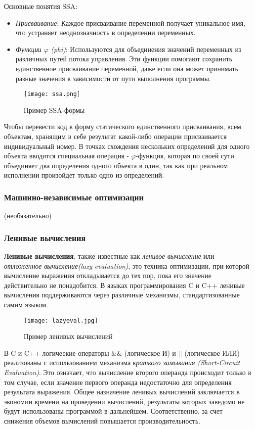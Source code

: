 Основные понятия SSA:
\begin{itemize}
    \item \textit{Присваивание}: Каждое присваивание переменной получает уникальное имя, что устраняет неоднозначность в определении переменных.
    \item \textit{Функции $\varphi$ (phi)}: Используются для объединения значений переменных из различных путей потока управления. Эти функции помогают сохранить единственное присваивание переменной, даже если она может принимать разные значения в зависимости от пути выполнения программы.
\end{itemize}

\begin{figure}[!htb]
    \centering
    \texttt{[image: ssa.png]}
    \caption{Пример SSA-формы}
\end{figure}

Чтобы перевести код в форму статического единственного присваивания, всем объектам, хранящим в себе результат какой-либо операции присваивается индивидуальный номер. В точках схождения нескольких определений для одного объекта вводится специальная операция - $\varphi$-функция, которая по своей сути объединяет два определения одного объекта в один, так как при реальном исполнении  произойдет только одно из определений.

\subsubsection{Машинно-независимые оптимизации}
(необязательно)
\subsubsection{Ленивые вычисления}

\textbf{Ленивые вычисления}, также известные как \textit{ленивое вычисление} или \textit{отложенное вычисление(lazy evaluation)}, это техника оптимизации, при которой вычисление выражения откладывается до тех пор, пока его значение действительно не понадобится. В языках программирования C и C++ ленивые вычисления поддерживаются через различные механизмы, стандартизованные самим языком.

\begin{figure}[!htb]
    \centering
    \texttt{[image: lazyeval.jpg]}
    \caption{Пример ленивых вычислений}
\end{figure}

В C и C++ логические операторы $\&\&$ (логическое И) и $||$ (логическое ИЛИ) реализованы с использованием механизма \textit{краткого замыкания (Short-Circuit Evaluation)}. Это означает, что вычисление второго операнда происходит только в том случае, если значение первого операнда недостаточно для определения результата выражения. Общее назначение ленивых вычислений заключается в экономии времени на проведении вычислений, результаты которых заведомо не будут использованы программой в дальнейшем. Соответственно, за счет снижения объемов вычислений повышается производительность. 

